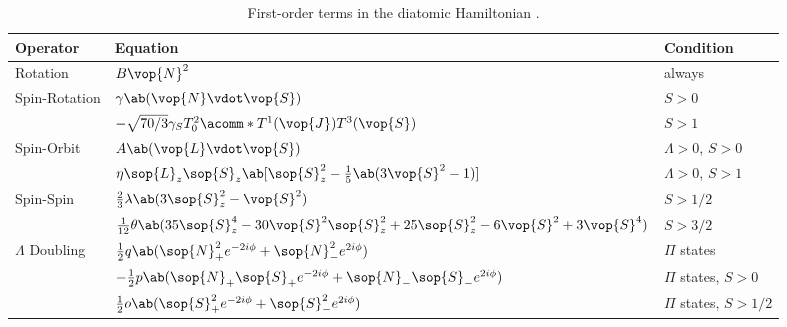 \begin{table}[H]
    \centering
    \renewcommand{\arraystretch}{1.5}
    \caption{First-order terms in the diatomic Hamiltonian \cite[232-233]{westernPGOPHERProgramSimulating2017}.}
    \begin{tabular}{lll}
        \toprule
        \textbf{Operator} & \textbf{Equation}                                                                                         & \textbf{Condition}      \\
        \midrule
        Rotation          & $B\vop{N}^2$                                                                                              & always                  \\
        \cmidrule{2-3}
        \multirow{2}{*}{Spin-Rotation}
        & $\gamma\ab(\vop{N}\vdot\vop{S})$                                                                          & $S > 0$                 \\
        & $-\sqrt{70/3}\gamma_ST_0^2\acomm*{T^1(\vop{J})}{T^3(\vop{S})}$                                            & $S > 1$                 \\
        \cmidrule{2-3}
        \multirow{2}{*}{Spin-Orbit}
        & $A\ab(\vop{L}\vdot\vop{S})$                                                                               & $\Lambda > 0$, $S > 0$  \\
        & $\eta\sop{L}_z\sop{S}_z\ab[\sop{S}_z^2 - \frac{1}{5}\ab(3\vop{S}^2 - 1)]$                                 & $\Lambda > 0$, $S > 1$  \\
        \cmidrule{2-3}
        \multirow{2}{*}{Spin-Spin}
        & $\frac{2}{3}\lambda\ab(3\sop{S}_z^2 - \vop{S}^2)$                                                         & $S > 1/2$               \\
        & $\frac{1}{12}\theta\ab(35\sop{S}_z^4 - 30\vop{S}^2\sop{S}_z^2 + 25\sop{S}_z^2 - 6\vop{S}^2 + 3\vop{S}^4)$ & $S > 3/2$               \\
        \cmidrule{2-3}
        \multirow{3}{*}{$\Lambda$ Doubling}
        & $\frac{1}{2}q\ab(\sop{N}_+^2e^{-2i\phi} + \sop{N}_-^2e^{2i\phi})$                                         & $\Pi$ states            \\
        & $-\frac{1}{2}p\ab(\sop{N}_+\sop{S}_+e^{-2i\phi} + \sop{N}_-\sop{S}_-e^{2i\phi})$                          & $\Pi$ states, $S > 0$   \\
        & $\frac{1}{2}o\ab(\sop{S}_+^2e^{-2i\phi} + \sop{S}_-^2e^{2i\phi})$                                         & $\Pi$ states, $S > 1/2$ \\
        \bottomrule
    \end{tabular}
\end{table}
